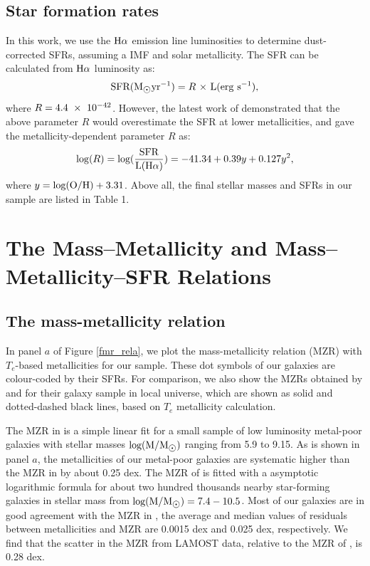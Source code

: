 \documentclass[usenatbib]{raa}
\begin{document}

\label{table1}

\subsection{Star formation rates}
\label{SFR}

In this work, we use the $\hbox{H$\alpha$}$ emission line luminosities to 
determine dust-corrected SFRs, assuming a \cite{2003PASP..115..763C} IMF and solar metallicity. The SFR can be calculated from $\hbox{H$\alpha$}$ luminosity as:
\begin{equation}
{\rm SFR(M_{\sun} yr^{-1})} = R \ {\rm \times \ L(erg \ s^{-1})},
\end{equation}
where $ R = 4.4 \ \times \ {\rm 10^{-42}}$. However, the latest work of 
\cite{2016ApJS..226....5L} demonstrated that the above parameter $R$
would overestimate the SFR at lower metallicities, and gave the
metallicity-dependent parameter $R$ as: 
 \begin{equation}
 {\rm log}(R) = {\rm log(\frac{SFR}{L(\hbox{H$\alpha$})})} = -41.34 + 0.39y + 0.127y^2,
 \end{equation}
where $y = \rm log(O/H) + 3.31$. 
Above all, the final stellar masses and SFRs in our sample are listed in Table 1.

\section{The Mass--Metallicity and Mass--Metallicity--SFR Relations}
\label{mz_fmr}

\subsection{The mass-metallicity relation}
\label{mz-rela}
In panel $a$ of Figure \ref{fmr_rela}, we plot the mass-metallicity relation (MZR)
with  $T_e$-based metallicities for our sample. These dot 
symbols of our galaxies are colour-coded by their SFRs.
For comparison,
we also show the MZRs obtained by \cite{2013ApJ...765..140A} and 
\cite{2012ApJ...754...98B} for their galaxy sample in local universe,
which are shown as solid and dotted-dashed black lines, based on
$T_e$ metallicity calculation.  
 
The MZR in \cite{2012ApJ...754...98B} is a simple linear fit for a small sample 
of low luminosity metal-poor galaxies with stellar masses $\rm log(M/M_{\hbox{$\odot$}})$
ranging from 5.9 to 9.15. As is shown in panel $a$, the metallicities of 
our 
metal-poor galaxies are systematic higher than the MZR in
\cite{2012ApJ...754...98B} by about 0.25 dex. The MZR of
\cite{2013ApJ...765..140A} is fitted with a asymptotic logarithmic
formula for about two hundred thousands 
nearby star-forming galaxies in stellar mass from $\rm log(M/M_{\hbox{$\odot$}})=7.4\--10.5$.
Most of our galaxies are in good agreement
with the MZR in \cite{2013ApJ...765..140A},  the 
average and median values of residuals between metallicities and MZR are 
0.0015 dex and 0.025 dex, respectively. 
 We find that the scatter in the MZR from LAMOST 
data, relative to the MZR of \cite{2013ApJ...765..140A}, is 0.28 dex.  
\end{document}
